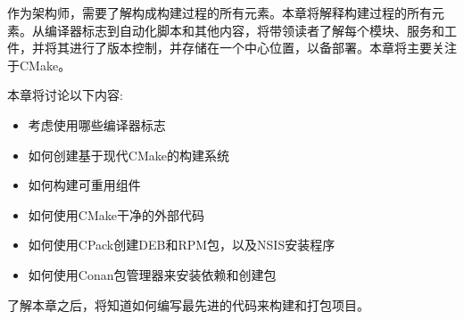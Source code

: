 
作为架构师，需要了解构成构建过程的所有元素。本章将解释构建过程的所有元素。从编译器标志到自动化脚本和其他内容，将带领读者了解每个模块、服务和工件，并将其进行了版本控制，并存储在一个中心位置，以备部署。本章将主要关注于CMake。

本章将讨论以下内容:

\begin{itemize}
\item 
考虑使用哪些编译器标志

\item 
如何创建基于现代CMake的构建系统

\item 
如何构建可重用组件

\item 
如何使用CMake干净的外部代码

\item 
如何使用CPack创建DEB和RPM包，以及NSIS安装程序

\item 
如何使用Conan包管理器来安装依赖和创建包
\end{itemize}

了解本章之后，将知道如何编写最先进的代码来构建和打包项目。 